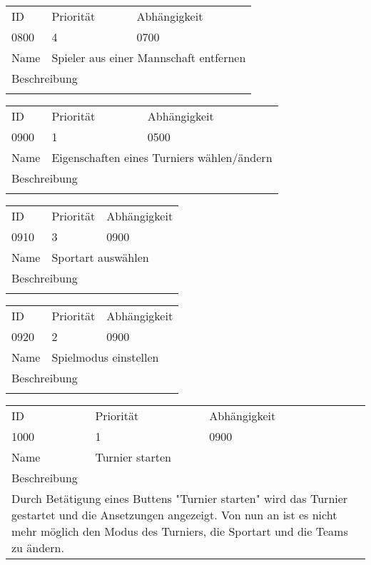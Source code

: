 	\begin{tabularx}{\textwidth}{|l|l|l|}
		ID & Priorität & Abhängigkeit \\
		0800 & 4 & 0700\\
		\hline
		Name & \multicolumn{2}{l}{Spieler aus einer Mannschaft entfernen} \\
		\multicolumn{3}{l}{Beschreibung}\\
		\multicolumn{3}{l}{}\\
		\hline		 
	\end{tabularx}
	
	\begin{tabularx}{\textwidth}{|l|l|l|}
		ID & Priorität & Abhängigkeit \\
		0900 & 1 & 0500\\
		\hline
		Name & \multicolumn{2}{l}{Eigenschaften eines Turniers wählen/ändern} \\
		\multicolumn{3}{l}{Beschreibung}\\
		\multicolumn{3}{l}{}\\
		\hline		 
	\end{tabularx}
	
	\begin{tabularx}{\textwidth}{|l|l|l|}
		ID & Priorität & Abhängigkeit \\
		0910 & 3 & 0900\\
		\hline
		Name & \multicolumn{2}{l}{Sportart auswählen} \\
		\multicolumn{3}{l}{Beschreibung}\\
		\multicolumn{3}{l}{}\\
		\hline		 
	\end{tabularx}
	
	\begin{tabularx}{\textwidth}{|l|l|l|}
		ID & Priorität & Abhängigkeit \\
		0920 & 2 & 0900\\
		\hline
		Name & \multicolumn{2}{l}{Spielmodus einstellen} \\
		\multicolumn{3}{l}{Beschreibung}\\
		\multicolumn{3}{l}{}\\
		\hline		 
	\end{tabularx}
	
	\begin{tabularx}{\textwidth}{|l|l|l|}
		ID & Priorität & Abhängigkeit \\
		1000 & 1 & 0900\\
		\hline
		Name & \multicolumn{2}{l}{Turnier starten} \\
		\multicolumn{3}{l}{Beschreibung}\\
		\multicolumn{3}{l}{Durch Betätigung eines Buttens "Turnier starten" wird das Turnier gestartet und die Ansetzungen angezeigt. Von nun an ist es nicht mehr möglich den Modus des Turniers, die Sportart und die Teams zu ändern. }\\
		\hline		 
	\end{tabularx}
	
